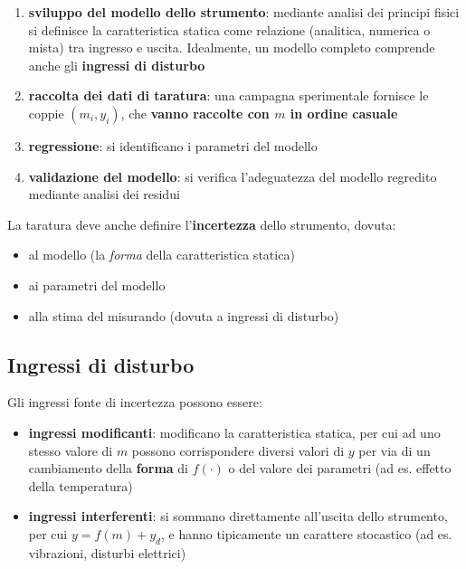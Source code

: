 \documentclass[
  letterpaper,
  DIV=11,
  numbers=noendperiod,
  oneside]{scrartcl}
\providecommand{\tightlist}{%
  \setlength{\itemsep}{0pt}\setlength{\parskip}{0pt}}
\begin{document}
\begin{enumerate}
\def\labelenumi{\arabic{enumi}.}
\tightlist
\item
  \textbf{sviluppo del modello dello strumento}: mediante analisi dei
  principi fisici si definisce la caratteristica statica come relazione
  (analitica, numerica o mista) tra ingresso e uscita. Idealmente, un
  modello completo comprende anche gli \textbf{ingressi di disturbo}
\item
  \textbf{raccolta dei dati di taratura}: una campagna sperimentale
  fornisce le coppie \((m_i, y_i)\), che \textbf{vanno raccolte con
  \(m\) in ordine casuale}
\item
  \textbf{regressione}: si identificano i parametri del modello
\item
  \textbf{validazione del modello}: si verifica l'adeguatezza del
  modello regredito mediante analisi dei residui
\end{enumerate}

La taratura deve anche definire l'\textbf{incertezza} dello strumento,
dovuta:

\begin{itemize}
\tightlist
\item
  al modello (la \emph{forma} della caratteristica statica)
\item
  ai parametri del modello
\item
  alla stima del misurando (dovuta a ingressi di disturbo)
\end{itemize}

\subsection{Ingressi di disturbo}\label{ingressi-di-disturbo}

Gli ingressi fonte di incertezza possono essere:

\begin{itemize}
\tightlist
\item
  \textbf{ingressi modificanti}: modificano la caratteristica statica,
  per cui ad uno stesso valore di \(m\) possono corrispondere diversi
  valori di \(y\) per via di un cambiamento della \textbf{forma} di
  \(f(\cdot)\) o del valore dei parametri (ad es. effetto della
  temperatura)
\item
  \textbf{ingressi interferenti}: si sommano direttamente all'uscita
  dello strumento, per cui \(y=f(m)+y_d\), e hanno tipicamente un
  carattere stocastico (ad es. vibrazioni, disturbi elettrici)
\end{itemize}
\end{document}
